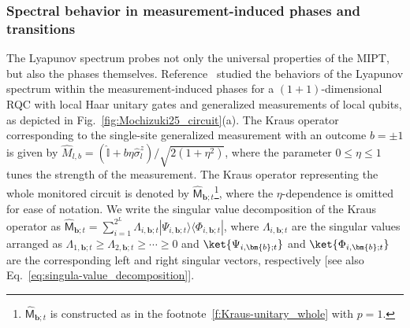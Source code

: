 \documentclass[preprint,pteplogo]{ptephy_v2}%
\numberwithin{equation}{section}
\theoremstyle{definition}
\begin{document}
\subsubsection{Spectral behavior in measurement-induced  phases and transitions}
The Lyapunov spectrum probes not only the universal properties of the MIPT, but also the phases themselves.
Reference~\cite{mochizuki2025measurement} studied the behaviors of the Lyapunov spectrum within the measurement-induced phases for a $(1+1)$-dimensional RQC with local Haar unitary gates and generalized measurements of local qubits, as depicted in Fig.~\ref{fig:Mochizuki25_circuit}(a).
The Kraus operator corresponding to the single-site generalized measurement with an outcome $b=\pm 1$ is given by $\hat{M}_{l,b} = (\hat{\mathbb{I}} + b\eta \hat{\sigma}^z_l)/\sqrt{2(1+\eta^2)}$, where the parameter $0\leq\eta\leq1$ tunes the strength of the measurement.
The Kraus operator representing the whole monitored circuit is denoted by $\hat{\mathsf{M}}_{\bm{b};t}$\footnote{
$\hat{\mathsf{M}}_{\bm{b};t}$ is constructed as in the footnote~\ref{f:Kraus-unitary_whole} with $p=1$.
}, where the $\eta$-dependence is omitted for ease of notation.
We write the singular value decomposition of the Kraus operator as $\hat{\mathsf{M}}_{\bm{b};t} = \sum_{i=1}^{2^L} \Lambda_{i,\bm{b};t} | \Psi_{i,\bm{b};t} \rangle \langle \Phi_{i,\bm{b};t} |$, where $\Lambda_{i,\bm{b};t}$ are the singular values arranged as $\Lambda_{1,\bm{b};t} \geq \Lambda_{2,\bm{b};t} \geq \cdots \geq 0$ and $\ket{\Psi_{i,\bm{b};t}}$ and $\ket{\Phi_{i,\bm{b};t}}$ are the corresponding left and right singular vectors, respectively [see also Eq.~\eqref{eq:singula-value_decomposition}].
\end{document}
